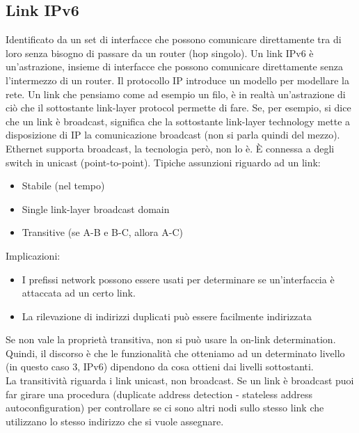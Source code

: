\documentclass{article}
\begin{document}
\subsection{Link IPv6}
Identificato da un set di interfacce che possono comunicare direttamente tra di loro senza bisogno di passare da un router (hop singolo). Un link IPv6 è un’astrazione, insieme di interfacce che possono comunicare direttamente senza l’intermezzo di un router. Il protocollo IP introduce un modello per modellare la rete. Un link che pensiamo come ad esempio un filo, è in realtà un'astrazione di ciò che il sottostante link-layer protocol permette di fare. Se, per esempio, si dice che un link è broadcast, significa che la sottostante link-layer technology mette a disposizione di IP la comunicazione broadcast (non si parla quindi del mezzo). \\ Ethernet supporta broadcast, la tecnologia però, non lo è. È connessa a degli switch in unicast (point-to-point).
Tipiche assunzioni riguardo ad un link:
\begin{itemize}
    \item Stabile (nel tempo)
    \item Single link-layer broadcast domain
    \item Transitive (se A-B e B-C, allora A-C)
\end{itemize}{}
Implicazioni:
\begin{itemize}
    \item I prefissi network possono essere usati per determinare se un'interfaccia è attaccata ad un certo link.
    \item La rilevazione di indirizzi duplicati può essere facilmente indirizzata
\end{itemize}{}
Se non vale la proprietà transitiva, non si può usare la on-link determination. Quindi, il discorso è che le funzionalità che otteniamo ad un determinato livello (in questo caso 3, IPv6) dipendono da cosa ottieni dai livelli sottostanti.\\ La transitività riguarda i link unicast, non broadcast. Se un link è broadcast puoi far girare una procedura (duplicate address detection - stateless address autoconfiguration) per controllare se ci sono altri nodi sullo stesso link che utilizzano lo stesso indirizzo che si vuole assegnare.
\end{document}

